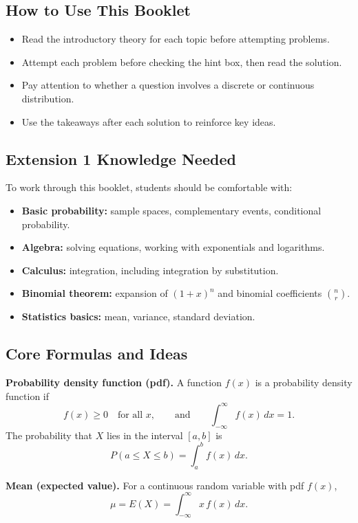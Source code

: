 \documentclass[12pt]{article}
\begin{document}
\subsection{How to Use This Booklet}
\begin{itemize}[leftmargin=*]
  \item Read the introductory theory for each topic before attempting problems.
  \item Attempt each problem before checking the hint box, then read the solution.
  \item Pay attention to whether a question involves a discrete or continuous distribution.
  \item Use the takeaways after each solution to reinforce key ideas.
\end{itemize}

\subsection{Extension 1 Knowledge Needed}
To work through this booklet, students should be comfortable with:
\begin{itemize}[leftmargin=*]
  \item \textbf{Basic probability:} sample spaces, complementary events, conditional probability.
  \item \textbf{Algebra:} solving equations, working with exponentials and logarithms.
  \item \textbf{Calculus:} integration, including integration by substitution.
  \item \textbf{Binomial theorem:} expansion of $(1+x)^n$ and binomial coefficients $\binom{n}{r}$.
  \item \textbf{Statistics basics:} mean, variance, standard deviation.
\end{itemize}



\subsection{Core Formulas and Ideas}

\textbf{Probability density function (pdf).} A function $f(x)$ is a probability density function if
\[
f(x) \geq 0 \quad \text{for all } x, \qquad \text{and} \qquad \int_{-\infty}^{\infty} f(x)\,dx = 1.
\]
The probability that $X$ lies in the interval $[a,b]$ is
\[
P(a \leq X \leq b) = \int_a^b f(x)\,dx.
\]

\textbf{Mean (expected value).} For a continuous random variable with pdf $f(x)$,
\[
\mu = E(X) = \int_{-\infty}^{\infty} x\,f(x)\,dx.
\]
\end{document}

